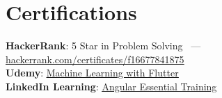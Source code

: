 \documentclass[letterpaper,11pt]{article}
\begin{document}
\section{Certifications}
 \begin{itemize}[leftmargin=0.15in, label={}]
    \small{\item{
     \textbf{HackerRank}{: 5 Star in Problem Solving ~---~ \href{https://www.hackerrank.com/certificates/f16677841875}{\underline{hackerrank.com/certificates/f16677841875}}} \\
     \textbf{Udemy}{: \href{https://www.udemy.com/certificate/UC-b0184650-7c9e-423b-aa4d-09d083a97cd4/}{\underline{Machine Learning with Flutter}}} \\
     \textbf{LinkedIn Learning}{: \href{https://www.linkedin.com/learning/certificates/865d204a3cd30821b492624df6082cf97362b2fa018b1b8285296d950e8f3eae}{\underline{Angular Essential Training}}} \\
    }}
 \end{itemize}
 \vspace{-16pt}
\end{document}
